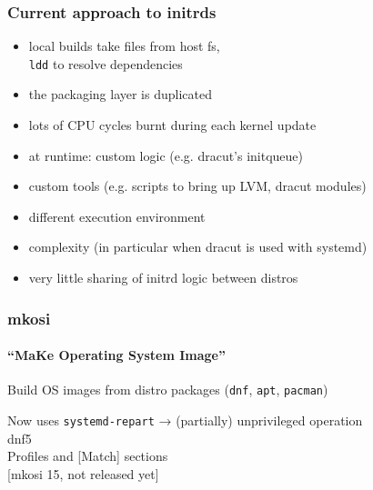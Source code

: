 \documentclass[]{beamer}
\newcommand\pp\pause
\begin{document}
\begin{frame}
  \frametitle{Current approach to initrds}




  \pp

  \begin{itemize}
  \item local builds take files from host fs,\\
    \texttt{ldd} to resolve dependencies
  \pp

  \item the packaging layer is duplicated
  \pp

  \item lots of CPU cycles burnt during each kernel update
  \pp

  \quad

  \item at runtime: custom logic (e.g. dracut's initqueue)
  \pp

  \item custom tools (e.g. scripts to bring up LVM, dracut modules)
  \pp

  \item different execution environment
  \pp

  \item complexity (in particular when dracut is used with systemd)
  \pp

  \quad

  \item very little sharing of initrd logic between distros
  \end{itemize}
\end{frame}

\begin{frame}
  \frametitle{mkosi}
  \framesubtitle{``\textbf{M}a\textbf{K}e \textbf{O}perating \textbf{S}ystem \textbf{I}mage''}

  Build OS images from distro packages (\texttt{dnf}, \texttt{apt}, \texttt{pacman})
  \pp

  \vfill

  Now uses \texttt{systemd-repart} → (partially) unprivileged operation
  \\

  dnf5
  \\

  Profiles and [Match] sections
  \\

  [mkosi 15, not released yet]
\end{frame}
\end{document}
